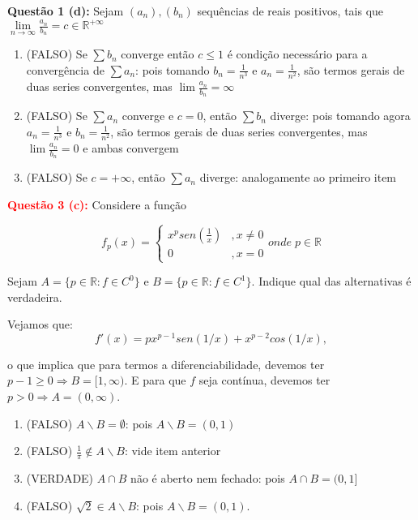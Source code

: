 \documentclass{article}
\begin{document}
\textbf{Questão 1 (d):} Sejam $(a_n), (b_n)$ sequências de reais positivos, tais 
que $\lim \limits_{n \to \infty} \frac{a_n}{b_n} =  c \in \mathbb{R}^{+\infty}$
\begin{enumerate}[label=(\alph*)]
  	\item (FALSO) Se $\sum b_n$ converge então $c \leq 1$ é condição necessário
  para a convergência de $\sum a_n$:
pois tomando $b_n = \frac{1}{n^3}$ e $a_n = \frac{1}{n^2}$, são termos gerais de duas series convergentes, mas $\lim \frac{a_n}{b_n} = \infty$

  	\item (FALSO) Se $\sum a_n$ converge e $c = 0$, então $\sum b_n$ diverge:
  pois tomando agora $a_n = \frac{1}{n^3}$ e $b_n = \frac{1}{n^2}$, são termos gerais de duas series convergentes, mas $\lim \frac{a_n}{b_n} = 0$ e ambas convergem

	\item (FALSO) Se $c = +\infty$, então $\sum a_n$ diverge: analogamente ao
  primeiro item

\end{enumerate}


\textcolor{red}{\textbf{Questão 3 (c):}} Considere a função 

$$ f_p(x)= 
\left\{
\begin{array}{cc}
      x^p sen(\frac{1}{x}) & , x\neq 0 \\
      0 & , x =0
\end{array} 
\right.
onde \; p \in \mathbb{R}
$$

Sejam $A = \{p \in \mathbb{R}: f \in C^0\}$ e $B = \{p \in \mathbb{R}: f \in
C^1\}$. Indique qual das alternativas é verdadeira.

Vejamos que:
$$f'(x) = px^{p-1}sen(1/x) + x^{p-2}cos(1/x),$$

o que implica que para termos a diferenciabilidade, devemos ter $p-1 \geq 0
\Rightarrow B = [1, \infty)$. E para que $f$ seja contínua, devemos ter $ p > 0
\Rightarrow A = (0, \infty)$.

\begin{enumerate}[label=(\alph*)]
  \item (FALSO) $A \backslash B = \emptyset $: pois $A \backslash B = (0,1)$
  
  \item (FALSO) $\frac{1}{\pi} \notin A \backslash B$: vide item anterior
  
  \item (VERDADE) $A \cap B$ não é aberto nem fechado: pois $A \cap B = (0,1]$
  
  \item (FALSO) $\sqrt{2} \in A \backslash B$: pois $A \backslash B = (0,1)$.
\end{enumerate}
\end{document}

